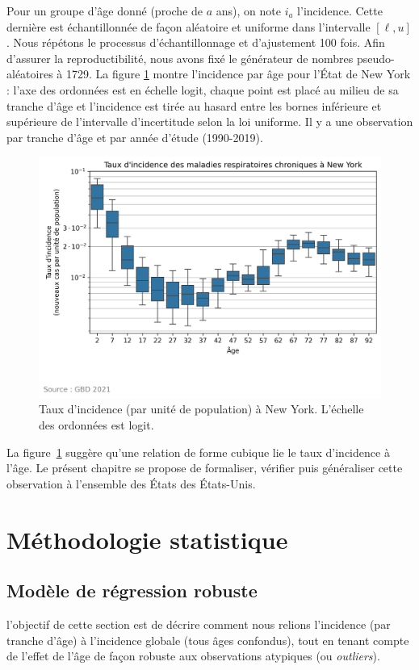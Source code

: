 Pour un groupe d'âge donné (proche de $a$ ans), on note $i_a$ l'incidence. Cette dernière est échantillonnée de façon aléatoire et uniforme dans l'intervalle \([\ell, u]\). Nous répétons le processus d’échantillonnage et d’ajustement 100 fois. Afin d’assurer la reproductibilité,
nous avons fixé le générateur de nombres pseudo-aléatoires à 1729. La figure \ref{fig:newyork-incidence} montre l'incidence par âge pour l'État de New York : l'axe des ordonnées est en échelle logit, chaque point est placé au milieu de sa tranche d'âge et l'incidence est tirée au hasard entre les bornes inférieure et supérieure de l'intervalle d'incertitude selon la loi uniforme. Il y a une observation par tranche d'âge et par année d'étude (1990-2019).

\begin{figure}[H]
	\centering
	\includegraphics[width=1\textwidth]{images/incidence_new_york.png}
	\caption{Taux d'incidence (par unité de population) à New York. L'échelle des ordonnées est logit.}
	\label{fig:newyork-incidence}
\end{figure}

La figure~\ref{fig:newyork-incidence} suggère qu’une relation de forme cubique lie le taux d'incidence à l'âge. Le présent chapitre se propose de formaliser, vérifier puis généraliser cette observation à l'ensemble des États des États-Unis.


\section{Méthodologie statistique}

\subsection{Modèle de régression robuste}
l'objectif de cette section est de décrire comment nous relions l'incidence (par tranche d'âge) à l'incidence globale (tous âges confondus), tout en tenant compte de l'effet de l'âge de façon robuste aux observations atypiques (ou \emph{outliers}). 

